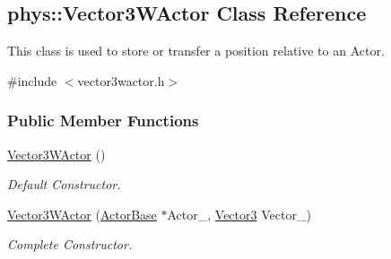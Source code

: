 \hypertarget{classphys_1_1Vector3WActor}{
\subsection{phys::Vector3WActor Class Reference}
\label{classphys_1_1Vector3WActor}
}


This class is used to store or transfer a position relative to an Actor.  




{\ttfamily \#include $<$vector3wactor.h$>$}

\subsubsection*{Public Member Functions}
\begin{DoxyCompactItemize}
\item 
\hyperlink{classphys_1_1Vector3WActor_a910f3ee25e7f654e7ba3bedb9942c8f7}{Vector3WActor} ()
\begin{DoxyCompactList}\small\item\em Default Constructor. \item\end{DoxyCompactList}\item 
\hyperlink{classphys_1_1Vector3WActor_ac87c4c55b9260f47f56fb01b6f061ded}{Vector3WActor} (\hyperlink{classphys_1_1ActorBase}{ActorBase} $\ast$Actor\_\-, \hyperlink{classphys_1_1Vector3}{Vector3} Vector\_\-)
\begin{DoxyCompactList}\small\item\em Complete Constructor. \item\end{DoxyCompactList}\end{DoxyCompactItemize}
